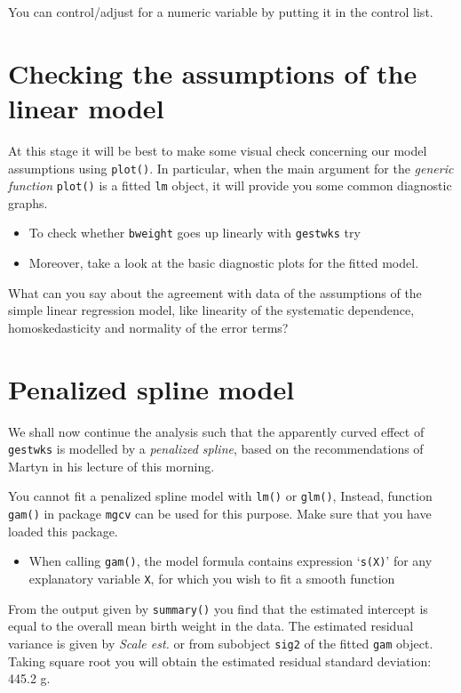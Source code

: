 \documentclass[
]{book}
\providecommand{\tightlist}{%
  \setlength{\itemsep}{0pt}\setlength{\parskip}{0pt}}
\begin{document}
You can control/adjust for a numeric variable by putting it in the control list.

\section{Checking the assumptions of the linear model}\label{checking-the-assumptions-of-the-linear-model}

At this stage it will be best to make some visual check concerning
our model assumptions using \texttt{plot()}. In particular, when the main argument
for the \emph{generic function} \texttt{plot()} is a fitted \texttt{lm} object,
it will provide you some common diagnostic graphs.

\begin{itemize}
\item
  To check whether \texttt{bweight} goes up linearly with \texttt{gestwks} try
\item
  Moreover, take a look at the basic diagnostic plots for the fitted model.
\end{itemize}

What can you say about the agreement with data of the assumptions of the
simple linear regression model,
like linearity of the systematic dependence,
homoskedasticity and normality of the error terms?

\section{Penalized spline model}\label{penalized-spline-model}

We shall now continue the analysis such that the apparently curved effect
of \texttt{gestwks} is modelled by a \emph{penalized spline},
based on the recommendations of Martyn in his lecture of this morning.

You cannot fit a penalized spline model with \texttt{lm()} or
\texttt{glm()}, Instead, function \texttt{gam()} in package
\texttt{mgcv} can be used for this purpose. Make sure that you have loaded
this package.

\begin{itemize}
\tightlist
\item
  When calling \texttt{gam()}, the model formula contains
  expression `\texttt{s(X)}' for any explanatory variable \texttt{X},
  for which you wish to fit a smooth function
\end{itemize}

From the output given by \texttt{summary()} you find that the
estimated intercept is equal to the overall mean birth
weight in the data. The estimated residual variance is given by
\emph{Scale est.} or from subobject \texttt{sig2} of the fitted
\texttt{gam} object. Taking square root you will obtain the estimated
residual standard deviation: 445.2 g.
\end{document}
